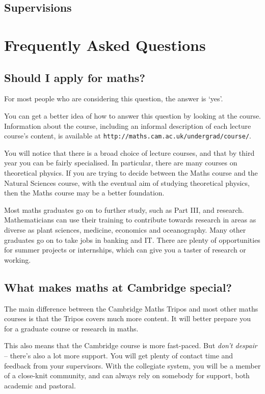 \documentclass[a4paper]{article}
\begin{document}
\subsection{Supervisions}


\section{Frequently Asked Questions}

\subsection{Should I apply for maths?} 

For most people who are considering this question, the answer is `yes'.

You can get a better idea of how to answer this question by looking at the
course. Information about the course, including an informal description of each
lecture course's content, is available at
\texttt{http://maths.cam.ac.uk/undergrad/course/}. 

You will notice that there is a broad choice of lecture courses, and that by
third year you can be fairly specialised. In particular, there are many courses
on theoretical physics. If you are trying to decide between the Maths course and
the Natural Sciences course, with the eventual aim of studying theoretical
physics, then the Maths course may be a better foundation. 

Most maths graduates go on to further study, such as Part III, and research.
Mathematicians can use their training to contribute towards research in areas as
diverse as plant sciences, medicine, economics and oceanography. Many other
graduates go on to take jobs in banking and IT.  There are plenty of
opportunities for summer projects or internships, which can give you a taster of
research or working.

\subsection{What makes maths at Cambridge special?}

The main difference between the Cambridge Maths Tripos and most other maths
courses is that the Tripos covers much more content. It will better prepare you
for a graduate course or research in maths. 

This also means that the Cambridge course is more fast-paced. But \textit{don't
despair} -- there's also a lot more support. You will get plenty of contact time
and feedback from your supervisors. With the collegiate system, you will be a
member of a close-knit community, and can always rely on somebody for support,
both academic and pastoral. 
\end{document}
